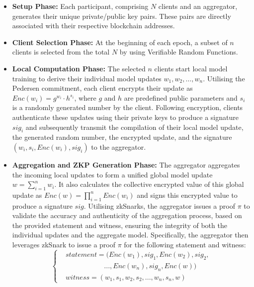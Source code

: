 \documentclass[conference]{IEEEtran}
\begin{document}
\begin{itemize}
    \item \textbf{Setup Phase:} Each participant, comprising $N$ clients and an aggregator, generates their unique private/public key pairs. These pairs are directly associated with their respective blockchain addresses.
    
    \item \textbf{Client Selection Phase:} At the beginning of each epoch, a subset of $n$ clients is selected from the total $N$ by using Verifiable Random Functions. 
    
    \item \textbf{Local Computation Phase:} The selected $n$ clients start local model training to derive their individual model updates $w_1, w_2, \ldots, w_n$. Utilising the Pedersen commitment, each client encrypts their update as $Enc(w_i) = g^{w_i}\cdot h^{s_i}$, where $g$ and $h$ are predefined public parameters and $s_i$ is a randomly generated number by the client. Following encryption, clients authenticate these updates using their private keys to produce a signature $sig_i$ and subsequently transmit the compilation of their local model update, the generated random number, the encrypted update, and the signature $(w_i, s_i, Enc(w_i), sig_i)$ to the aggregator.
    
    \item \textbf{Aggregation and ZKP Generation Phase:} The aggregator aggregates the incoming local updates to form a unified global model update $w = \sum_{i=1}^{n} {w_i}$. It also calculates the collective encrypted value of this global update as $Enc(w) = \prod_{i=1}^n Enc(w_i)$ and signs this encrypted value to produce a signature $sig$. Utilising zkSnarks, the aggregator issues a proof $\pi$ to validate the accuracy and authenticity of the aggregation process, based on the provided statement and witness, ensuring the integrity of both the individual updates and the aggregate model. Specifically, the aggregator then leverages zkSnark to issue a proof $\pi$ for the following statement and witness: 
\begin{equation*}
    \begin{cases}
      & \text{$statement = (Enc(w_1),sig_1, Enc(w_2), sig_2, $}\\
      &~~~~~~~~~~~~~~~~~~~~~~~~~\text{$..., Enc(w_n), sig_n, Enc(w))$}\\
     & \text{$witness = (w_1, s_1, w_2, s_2,..., w_n, s_n, w)$}
    \end{cases}       
\end{equation*}




\end{itemize}
\end{document}
